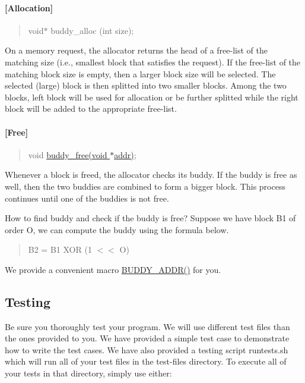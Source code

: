\paragraph*{\mbox{[}Allocation\mbox{]}}

\begin{quote}
{\ttfamily void$\ast$ buddy\+\_\+alloc (int size);} \end{quote}


On a memory request, the allocator returns the head of a free-\/list of the matching size (i.\+e., smallest block that satisfies the request). If the free-\/list of the matching block size is empty, then a larger block size will be selected. The selected (large) block is then splitted into two smaller blocks. Among the two blocks, left block will be used for allocation or be further splitted while the right block will be added to the appropriate free-\/list.

\paragraph*{\mbox{[}Free\mbox{]}}

\begin{quote}
{\ttfamily void \hyperlink{buddy_8h_a961ef8a2fd9df43d50945100f172b97a}{buddy\+\_\+free(void $\ast$addr)};} \end{quote}


Whenever a block is freed, the allocator checks its buddy. If the buddy is free as well, then the two buddies are combined to form a bigger block. This process continues until one of the buddies is not free.

How to find buddy and check if the buddy is free? Suppose we have block B1 of order O, we can compute the buddy using the formula below.

\begin{quote}
{\ttfamily B2 = B1 X\+OR (1 $<$$<$ O)} \end{quote}
We provide a convenient macro \hyperlink{buddy_8c_aae7263f0e40a1e0dfefa6f53652a4a05}{B\+U\+D\+D\+Y\+\_\+\+A\+D\+D\+R()} for you.

\subsection*{Testing}

Be sure you thoroughly test your program. We will use different test files than the ones provided to you. We have provided a simple test case to demonstrate how to write the test cases. We have also provided a testing script {\ttfamily runtests.\+sh} which will run all of your test files in the test-\/files directory. To execute all of your tests in that directory, simply use either\+:

